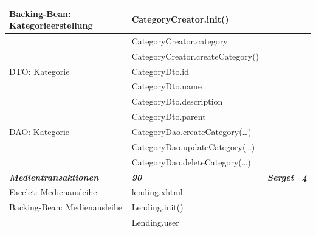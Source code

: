 \documentclass{article}
\begin{document}
\begin{longtable}{|l|l|l|l|}
\hline
Backing-Bean: Kategorieerstellung       & CategoryCreator.init()                   &                             &                        \\ 
\hline
                                        & CategoryCreator.category                 &                             &                        \\ 
\hline
                                        & CategoryCreator.createCategory()         &                             &                        \\ 
\hline
DTO: Kategorie                          & CategoryDto.id                           &                             &                        \\ 
\hline
                                        & CategoryDto.name                         &                             &                        \\ 
\hline
                                        & CategoryDto.description                  &                             &                        \\ 
\hline
                                        & CategoryDto.parent                       &                             &                        \\ 
\hline
DAO: Kategorie                          & CategoryDao.createCategory(…)            &                             &                        \\ 
\hline
                                        & CategoryDao.updateCategory(…)            &                             &                        \\ 
\hline
                                        & CategoryDao.deleteCategory(…)            &                             &                        \\ 
\hline
\textbf{\textit{Medientransaktionen}}   & \textbf{\textit{90}}                     & \textbf{\textit{Sergei}}    & \textbf{\textit{4}}    \\ 
\hline
Facelet: Medienausleihe                 & lending.xhtml                            &                             &                        \\ 
\hline
Backing-Bean: Medienausleihe            & Lending.init()                           &                             &                        \\ 
\hline
                                        & Lending.user                             &                             &                        \\ 

\end{longtable}
\end{document}
